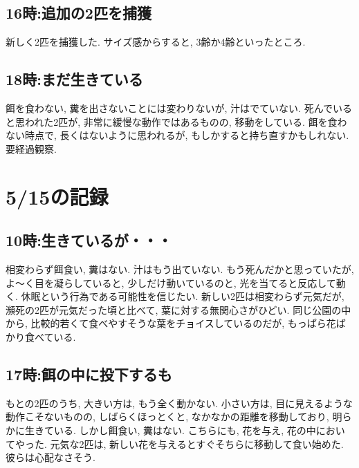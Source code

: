 \documentclass{jsarticle}
\begin{document}
\subsection{16時:追加の2匹を捕獲}
新しく2匹を捕獲した. サイズ感からすると, 3齢か4齢といったところ. 

\subsection{18時:まだ生きている}
餌を食わない, 糞を出さないことには変わりないが, 汁はでていない. 
死んでいると思われた2匹が, 非常に緩慢な動作ではあるものの, 移動をしている. 
餌を食わない時点で, 長くはないように思われるが, もしかすると持ち直すかもしれない. 要経過観察. 

\section{5/15の記録}
\subsection{10時:生きているが・・・}
相変わらず餌食い, 糞はない. 汁はもう出ていない.
もう死んだかと思っていたが, よ〜く目を凝らしていると, 少しだけ動いているのと, 
光を当てると反応して動く. 休眠という行為である可能性を信じたい. 
新しい2匹は相変わらず元気だが, 瀕死の2匹が元気だった頃と比べて, 葉に対する無関心さがひどい. 
同じ公園の中から, 比較的若くて食べやすそうな葉をチョイスしているのだが, もっぱら花ばかり食べている. 

\subsection{17時:餌の中に投下するも}
もとの2匹のうち, 大きい方は, もう全く動かない. 小さい方は, 目に見えるような動作こそないものの, 
しばらくほっとくと, なかなかの距離を移動しており, 明らかに生きている. しかし餌食い, 糞はない. 
こちらにも, 花を与え, 花の中においてやった. 
元気な2匹は, 新しい花を与えるとすぐそちらに移動して食い始めた. 彼らは心配なさそう. 
\end{document}
